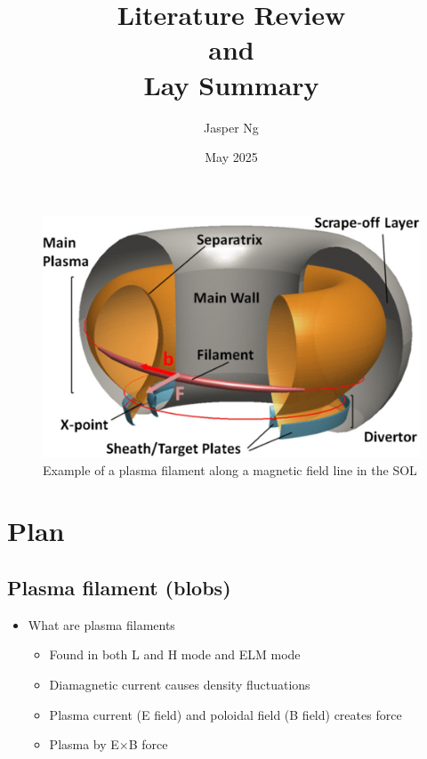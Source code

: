 \documentclass{article}
\title{\textbf{Literature Review \\and \\Lay Summary}}
\author{Jasper Ng}
\date{May 2025}
\begin{document}
\maketitle

\begin{figure}[h]
    \centering
    \includegraphics[scale=0.6]{Fig1_plasma_filament.png}
    \normalsize{\caption{Example of a plasma filament along a magnetic field line in the SOL \cite{carralero_experimental_2015}}}
    \label{fig:fig1}
\end{figure}

\section*{Plan}
\subsection*{Plasma filament (blobs)}
\begin{itemize}
    \item What are plasma filaments \cite{omotani_effects_2015}
    \begin{itemize}
        \item Found in both L and H mode \cite{boedo_transport_2003} and ELM mode \cite{ben_ayed_inter-elm_2009}
        \item Diamagnetic current causes density fluctuations
        \item Plasma current (E field) and poloidal field (B field) creates force
        \item Plasma by E$\times$B force
        
    \end{itemize}
\end{itemize}
\end{document}
